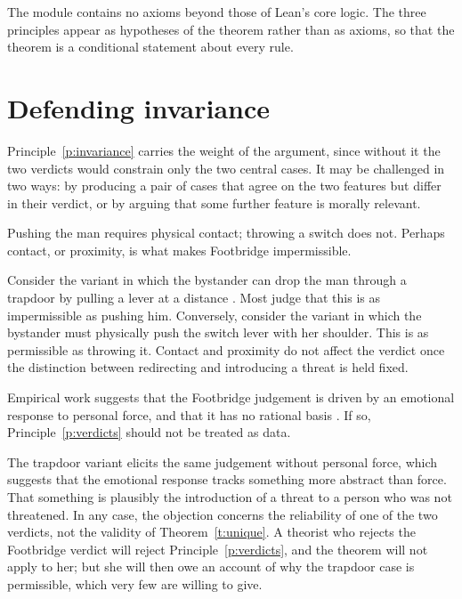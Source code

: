 \documentclass{situationist-preprint}
\begin{document}
The module contains no axioms beyond those of Lean's core logic. The three principles appear as hypotheses of the theorem rather than as axioms, so that the theorem is a conditional statement about every rule.

\section{Defending invariance}

Principle~\ref{p:invariance} carries the weight of the argument, since without it the two verdicts would constrain only the two central cases. It may be challenged in two ways: by producing a pair of cases that agree on the two features but differ in their verdict, or by arguing that some further feature is morally relevant.

\begin{objection}[Proximity]
Pushing the man requires physical contact; throwing a switch does not. Perhaps contact, or proximity, is what makes Footbridge impermissible.
\end{objection}

\begin{reply}
Consider the variant in which the bystander can drop the man through a trapdoor by pulling a lever at a distance \citep{Thomson1985}. Most judge that this is as impermissible as pushing him. Conversely, consider the variant in which the bystander must physically push the switch lever with her shoulder. This is as permissible as throwing it. Contact and proximity do not affect the verdict once the distinction between redirecting and introducing a threat is held fixed.
\end{reply}

\begin{objection}
Empirical work suggests that the Footbridge judgement is driven by an emotional response to personal force, and that it has no rational basis \citep{Greene2001}. If so, Principle~\ref{p:verdicts} should not be treated as data.
\end{objection}

\begin{reply}
The trapdoor variant elicits the same judgement without personal force, which suggests that the emotional response tracks something more abstract than force. That something is plausibly the introduction of a threat to a person who was not threatened. In any case, the objection concerns the reliability of one of the two verdicts, not the validity of Theorem~\ref{t:unique}. A theorist who rejects the Footbridge verdict will reject Principle~\ref{p:verdicts}, and the theorem will not apply to her; but she will then owe an account of why the trapdoor case is permissible, which very few are willing to give.
\end{reply}
\end{document}
